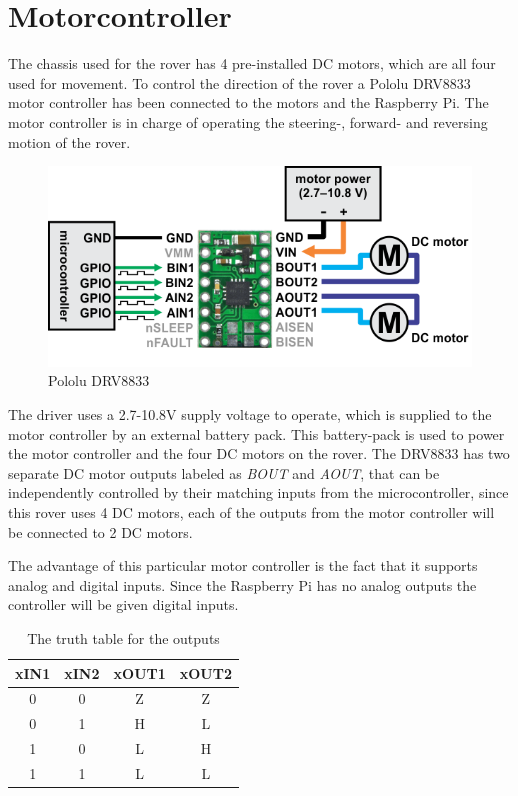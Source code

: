 \clearpage
\section{Motorcontroller}

The chassis used for the rover has 4 pre-installed DC motors, which are all four used for movement. To control the direction of the rover a Pololu DRV8833 motor controller has been connected to the motors and the Raspberry Pi. The motor controller is in charge of operating the steering-, forward- and reversing motion of the rover.

\begin{figure}[H]
	\centering
	\includegraphics[width=.8\linewidth]{images/DRV8833.png}
	\caption{Pololu DRV8833\cite{DRV8833pic}}
	\label{fig:polulu}
\end{figure}

The driver uses a 2.7-10.8V supply voltage to operate, which is supplied to the motor controller by an external battery pack. This battery-pack is used to power the motor controller and the four DC motors on the rover. The DRV8833 has two separate DC motor outputs labeled as \textit{BOUT} and \textit{AOUT}, that can be independently controlled by their matching inputs from the microcontroller, since this rover uses 4 DC motors, each of the outputs from the motor controller will be connected to 2 DC motors.

The advantage of this particular motor controller is the fact that it supports analog and digital inputs. Since the Raspberry Pi has no analog outputs the controller will be given digital inputs. 

\begin{table}[H]
	\centering
	\begin{tabular}{|c|c|c|c|}
		\hline
		xIN1 & xIN2 & xOUT1 & xOUT2 \\ \hline
		0    & 0    & Z     & Z     \\ \hline
		0    & 1    & H     & L     \\ \hline
		1    & 0    & L     & H     \\ \hline
		1    & 1    & L     & L     \\ \hline
	\end{tabular}
	\caption{The truth table for the outputs}
	\label{motorcontrollertruthtabel}
\end{table}

